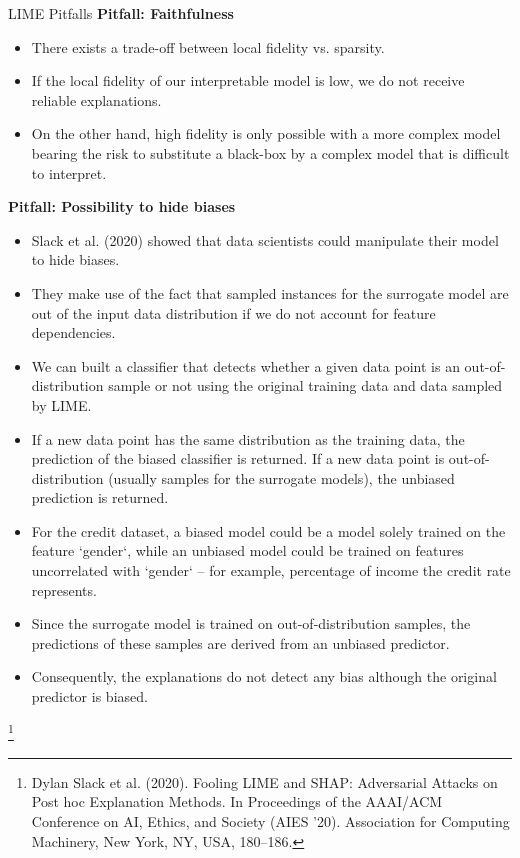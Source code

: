 \documentclass[11pt,compress,t,notes=noshow, xcolor=table]{beamer}
\begin{document}
\begin{vbframe}{LIME Pitfalls}
\textbf{Pitfall: Faithfulness}
\begin{itemize}
	\item There exists a trade-off between local fidelity vs. sparsity. 
	\item If the local fidelity of our interpretable model is low, we do not receive reliable explanations.
	\item On the other hand, high fidelity is only possible with a more complex model bearing the risk to substitute a black-box by a complex model that is difficult to interpret.
\end{itemize}
\framebreak

\textbf{Pitfall: Possibility to hide biases}
\begin{itemize}
	\item Slack et al. (2020) showed that data scientists could manipulate their model to hide biases. 
	\item They make use of the fact that sampled instances for the surrogate model are out of the input data distribution if we do not account for feature dependencies. 
	\item We can built a classifier that detects whether a given data point is an out-of-distribution sample or not using the original training data and data sampled by LIME. 
	\item If a new data point has the same distribution as the training data, the prediction of the biased classifier is returned. If a new data point is out-of-distribution (usually samples for the surrogate models), the unbiased prediction is returned.
	\item For the credit dataset, a biased model could be a model solely trained on the feature `gender`, while an unbiased model could be trained on features uncorrelated with `gender` -- for example, percentage of income the credit rate represents.   
	\item Since the surrogate model is trained on out-of-distribution samples, the predictions of these samples are derived from an unbiased predictor. 
	\item Consequently, the explanations do not detect any bias although the original predictor is biased. 
\end{itemize}
\footnote[frame]{Dylan Slack et al. (2020). Fooling LIME and SHAP: Adversarial Attacks on Post hoc Explanation Methods. In Proceedings of the AAAI/ACM Conference on AI, Ethics, and Society (AIES '20). Association for Computing Machinery, New York, NY, USA, 180–186.}
\end{vbframe}
\end{document}
